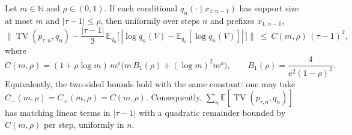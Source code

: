 \begin{theorem}\label{thm:second-order-temp-law}
Let $m\in\mathbb{N}$ and $\rho\in(0,1)$. If each conditional $q_n(\cdot\mid x_{1:n-1})$ has support size at most $m$ and $|\tau-1|\le \rho$, then uniformly over steps $n$ and prefixes $x_{1:n-1}$,
\[
\Big\|\operatorname{TV}(p_{\tau,n},q_n)-\frac{|\tau-1|}{2}\,\mathbb{E}_{q_n}\big[\,|\log q_n(V)-\mathbb{E}_{q_n}[\log q_n(V)]|\,\big]\Big\|\ \le\ C(m,\rho)\,(\tau-1)^2,
\]
where
\[
C(m,\rho)=(1+\rho\log m)\,m^{\rho}\Big(m\,B_1(\rho)+ (\log m)^2 m^{\rho}\Big),\qquad B_1(\rho)=\frac{4}{e^2(1-\rho)^2}.
\]
Equivalently, the two-sided bounds hold with the same constant: one may take $C_-(m,\rho)=C_+(m,\rho)=C(m,\rho)$. Consequently, $\sum_n\mathbb{E}[\operatorname{TV}(p_{\tau,n},q_n)]$ has matching linear terms in $|\tau-1|$ with a quadratic remainder bounded by $C(m,\rho)$ per step, uniformly in $n$.
\end{theorem}

